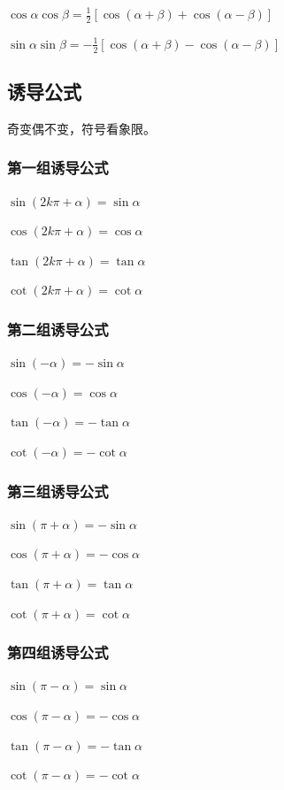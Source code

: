 \documentclass[UTF8]{ctexbook}
\begin{document}
{{{  $\cos{\alpha}\cos{\beta} = \frac{1}{2}[\cos{(\alpha + \beta)} + \cos{(\alpha - \beta)}]$

  $\sin{\alpha}\sin{\beta} = -\frac{1}{2}[\cos{(\alpha + \beta)} - \cos{(\alpha - \beta)}]$
}%

\subsection{诱导公式}{
  \indent 奇变偶不变，符号看象限。
  \subsubsection{第一组诱导公式}{
    $\sin{(2k\pi + \alpha)} = \sin{\alpha}$

    $\cos{(2k\pi + \alpha)} = \cos{\alpha}$

    $\tan(2k\pi + \alpha) = \tan\alpha$

    $\cot(2k\pi + \alpha) = \cot\alpha$
  }%

  \subsubsection{第二组诱导公式}{
    $\sin(-\alpha) = -\sin\alpha$

    $\cos(-\alpha) = \cos\alpha$

    $\tan(-\alpha) = -\tan\alpha$

    $\cot(-\alpha) = -\cot\alpha$
  }%

  \subsubsection{第三组诱导公式}{
    $\sin(\pi + \alpha) = -\sin\alpha$

    $\cos(\pi + \alpha) = -\cos\alpha$

    $\tan(\pi + \alpha) = \tan\alpha$

    $\cot(\pi + \alpha) = \cot\alpha$
  }%

  \subsubsection{第四组诱导公式}{
    $\sin(\pi - \alpha) = \sin\alpha$

    $\cos(\pi - \alpha) = -\cos\alpha$

    $\tan(\pi - \alpha) = -\tan\alpha$

    $\cot(\pi - \alpha) = -\cot\alpha$
  }%

}}}
\end{document}
